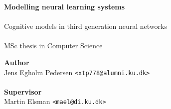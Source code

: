 \documentclass[a4paper,oneside]{memoir}
\begin{document}
\newcommand{\obar}{%
    \mathrel{\reflectbox{\rotatebox[origin=c]{90}{$\ominus$}}}}

    \thispagestyle{empty}
    \begin{adjustwidth}{-3cm}{-1.5cm}
      \vspace*{3cm}
      \textbf{\Huge Modelling neural learning systems} \\
      \\[0.2cm]
      {\huge Cognitive models in third generation neural networks}\\
      \\[1.6cm]
      {\Large MSc thesis in Computer Science}
      \\[9cm]
      \begin{tabbing}
      \textbf{\Large Author} \\
      Jens Egholm Pedersen \hspace{1cm} \= \texttt{<xtp778@alumni.ku.dk>} \\
      \\[1cm]
      \textbf{\Large Supervisor} \\
      Martin Elsman \hspace{1cm} \= \texttt{<mael@di.ku.dk>}
      \end{tabbing}
    \end{adjustwidth}

    \newpage

    \ClearWallPaper

\renewcommand\cftchapteraftersnumb{\normalfont}
\renewcommand\cftbeforechapterskip{5pt plus 1pt}

\frontmatter


\pagebreak

\setcounter{tocdepth}{2}
\tableofcontents*
\newpage

\begin{comment}

\section{How to read this thesis}
\section{Acknowledgements}
Kerem for providing internet.
\end{comment}
\end{document}
